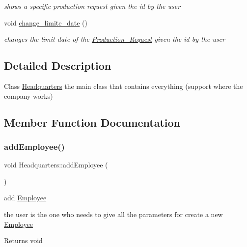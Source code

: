 \begin{DoxyCompactItemize}
\begin{DoxyCompactList}\small\item\em shows a specific production request given the id by the user \end{DoxyCompactList}\item 
void \hyperlink{class_headquarters_a2fb8bbaf08e42b7ddb62b759298e780c}{change\+\_\+limite\+\_\+date} ()
\begin{DoxyCompactList}\small\item\em changes the limit date of the \hyperlink{class_production___request}{Production\+\_\+\+Request} given the id by the user \end{DoxyCompactList}\end{DoxyCompactItemize}


\subsection{Detailed Description}
Class \hyperlink{class_headquarters}{Headquarters} the main class that contains everything (support where the company works) 

\subsection{Member Function Documentation}
\mbox{\label{class_headquarters_ac99ce9ba98b3bdddef13fedd5d2528f0}} 
\subsubsection{\texorpdfstring{add\+Employee()}{addEmployee()}}
{\footnotesize\ttfamily void Headquarters\+::add\+Employee (\begin{DoxyParamCaption}{ }\end{DoxyParamCaption})}



add \hyperlink{class_employee}{Employee} 

the user is the one who needs to give all the parameters for create a new \hyperlink{class_employee}{Employee}

\begin{DoxyReturn}{Returns}
void 
\end{DoxyReturn}
\mbox{\label{class_headquarters_acc151cbc13eaee84fdd6ac8d2bdf83bb}} 
